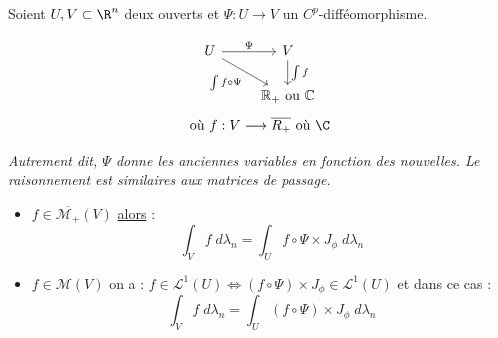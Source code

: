 \begin{theorem}
    Soient $U,V \subset \R^n$ deux ouverts et $\Psi : U \longrightarrow V$ un $C^p$-difféomorphisme. 

    \vspace{0.5cm}
    \begin{minipage}{0.45\textwidth}
        \[
        \begin{tikzcd}[scale=1.25\textwidth]
            U \arrow[r, "\Psi"] \arrow[rd, "\int f \circ \Psi" swap] & V \arrow[d, "\int f"] \\
                                                                   & \mathbb{R}_+ \text{ ou } \mathbb{C}
        \end{tikzcd}
        \]
        \[ \text{où } f : V \longrightarrow \overline{R_+} \text{ où } \C \]
    \end{minipage}
    \hfill
    \begin{minipage}{0.45\textwidth}
        \emph{Autrement dit, $\Psi$ donne les anciennes variables en fonction des nouvelles. 
        Le raisonnement est similaires aux matrices de passage.}
    \end{minipage}
    \vspace{0.5cm}
    \begin{itemize}
        \item[\underline{si}] $f \in \overline{\mathcal{M}_+}(V)$ \underline{alors} :
            \[ \boxed{ \int_V f \; d \lambda_n = \int_U f \circ \Psi \times J_\phi \; d \lambda_n} \] 
        \item[\underline{si}] $f \in {\mathcal{M}}(V)$ on a : $ f \in \mathcal{L}^1(U) \Longleftrightarrow (f \circ \Psi) \times J_\phi \in \mathcal{L}^1(U) $
             et dans ce cas :
                \[ \int_V f \; d \lambda_n = \int_U (f \circ \Psi) \times J_\phi \; d \lambda_n \]
    \end{itemize}
\end{theorem}


